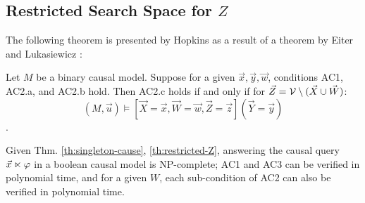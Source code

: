 \subsection{\texorpdfstring
    {Restricted Search Space for $Z$}
    {Restricte Search Space for \textit{Z}}
}

The following theorem is presented by Hopkins
\cite{hopkins2002strategies} as a result of a theorem by Eiter and 
Lukasiewicz \cite{eiter2001complexity}:

\begin{theorem}\label{th:restricted-Z}
    Let $M$ be a binary causal model. Suppose for a given $\vec{x},\vec{y},\vec{w}$, 
    conditions AC1, AC2.a, and AC2.b hold. Then AC2.c holds if and 
    only if for $\vec{Z}=\mathcal{V} \setminus (\vec{X} \cup \vec{W})$:
    $$ (M, \vec{u}) \models 
      [\vec{X}=\vec{x}, \vec{W}=\vec{w}, \vec{Z}=\vec{z}] (\vec{Y}=\vec{y})
    $$. 
\end{theorem}

 Given Thm. \ref{th:singleton-cause}, \ref{th:restricted-Z}, 
answering the causal query $\vec{x} \ltimes \varphi$ in a boolean 
causal model is NP-complete; AC1 and AC3 can be verified in 
polynomial time, and for a given $W$, each sub-condition of AC2 
can also be verified in polynomial time.